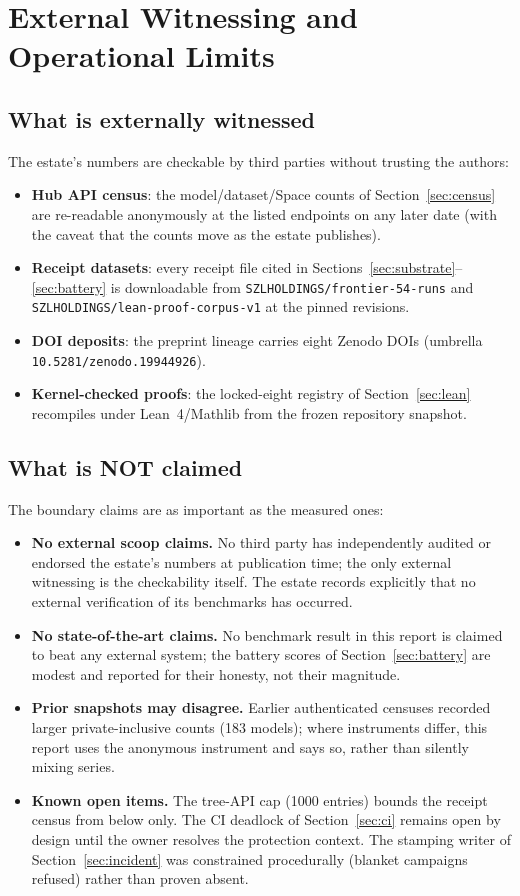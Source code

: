 
\section{External Witnessing and Operational Limits}
\label{sec:limits}

\subsection{What is externally witnessed}
The estate's numbers are checkable by third parties without trusting the authors:
\begin{itemize}
\item \textbf{Hub API census}: the model/dataset/Space counts of Section~\ref{sec:census} are re-readable anonymously at the listed endpoints on any later date (with the caveat that the counts move as the estate publishes).
\item \textbf{Receipt datasets}: every receipt file cited in Sections~\ref{sec:substrate}--\ref{sec:battery} is downloadable from \texttt{SZLHOLDINGS/frontier-54-runs} and \texttt{SZLHOLDINGS/lean-proof-corpus-v1} at the pinned revisions.
\item \textbf{DOI deposits}: the preprint lineage carries eight Zenodo DOIs (umbrella \texttt{10.5281/zenodo.19944926}).
\item \textbf{Kernel-checked proofs}: the locked-eight registry of Section~\ref{sec:lean} recompiles under Lean~4/Mathlib from the frozen repository snapshot.
\end{itemize}

\subsection{What is NOT claimed}
The boundary claims are as important as the measured ones:
\begin{itemize}
\item \textbf{No external scoop claims.} No third party has independently audited or endorsed the estate's numbers at publication time; the only external witnessing is the checkability itself. The estate records explicitly that no external verification of its benchmarks has occurred.
\item \textbf{No state-of-the-art claims.} No benchmark result in this report is claimed to beat any external system; the battery scores of Section~\ref{sec:battery} are modest and reported for their honesty, not their magnitude.
\item \textbf{Prior snapshots may disagree.} Earlier authenticated censuses recorded larger private-inclusive counts (183 models); where instruments differ, this report uses the anonymous instrument and says so, rather than silently mixing series.
\item \textbf{Known open items.} The tree-API cap (1000 entries) bounds the receipt census from below only. The CI deadlock of Section~\ref{sec:ci} remains open by design until the owner resolves the protection context. The stamping writer of Section~\ref{sec:incident} was constrained procedurally (blanket campaigns refused) rather than proven absent.
\end{itemize}

